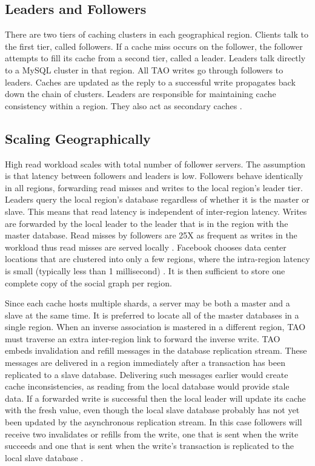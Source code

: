\documentclass[9pt,twocolumn,twoside]{../../styles/osajnl}
\begin{document}
\subsection {Leaders and Followers}
There are two tiers of caching clusters in each geographical region. Clients talk to the first tier, called followers. If a cache miss occurs on the follower, the follower attempts to fill its cache from a second tier, called a leader. Leaders talk directly to a MySQL cluster in that region. All TAO writes go through followers to leaders. Caches are updated as the reply to a successful write propagates back down the chain of clusters. Leaders are responsible for maintaining cache consistency within a region. They also act as secondary caches \cite{www-tao2}.

\subsection {Scaling Geographically}
High read workload scales with total number of follower servers. The assumption is that latency between followers and leaders is low. Followers behave identically in all regions, forwarding read misses and writes to the local region’s leader tier. Leaders query the local region’s database regardless of whether it is the master or slave. This means that read latency is independent of inter-region latency. Writes are forwarded by the local leader to the leader that is in the region with the master database. Read misses by followers are 25X as frequent as writes in the workload thus read misses are served locally \cite{www-tao4}. Facebook chooses data center locations that are clustered into only a few regions, where the intra-region latency is small (typically less than 1 millisecond) \cite{www-tao4}. It is then sufficient to store one complete copy of the social graph per region.

Since each cache hosts multiple shards, a server may be both a master and a slave at the same time. It is preferred to locate all of the master databases in a single region. When an inverse association is mastered in a different region, TAO must traverse an extra inter-region link to forward the inverse write. TAO embeds invalidation and refill messages in the database replication stream. These messages are delivered in a region immediately after a transaction has been replicated to a slave database. Delivering such messages earlier would create cache inconsistencies, as reading from the local database would provide stale data. If a forwarded write is successful then the local leader will update its cache with the fresh value, even though the local slave database probably has not yet been updated by the asynchronous replication stream. In this case followers will receive two invalidates or refills from the write, one that is sent when the write succeeds and one that is sent when the write’s transaction is replicated to the local slave database \cite{www-tao4}.
\end{document}
